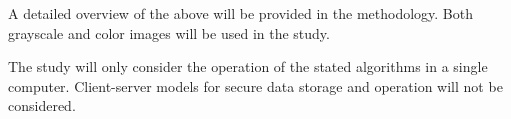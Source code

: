 A detailed overview of the above will be provided in the methodology.
Both grayscale and color images will be used in the study.

The study will only consider the operation of the stated algorithms in a single computer. Client-server models for secure data storage and operation will not be considered.
